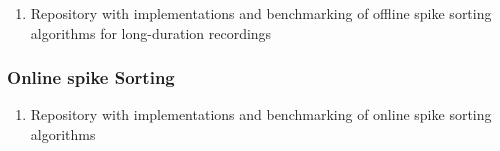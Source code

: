 
\begin{enumerate}

    \item Repository with implementations and benchmarking of offline spike
        sorting algorithms for long-duration recordings

\end{enumerate}

\subsubsection{Online spike Sorting}
\label{sec:onlineSpikeSorting}


\begin{enumerate}

    \item Repository with implementations and benchmarking of online spike
        sorting algorithms

\end{enumerate}


